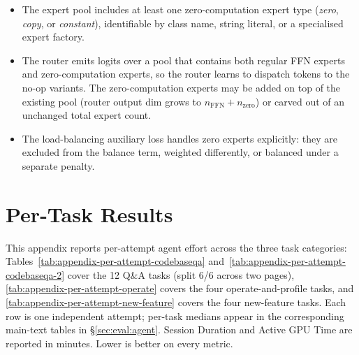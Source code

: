 \begin{itemize}
  \setlength\itemsep{1pt}
  \item[R1.] The expert pool includes at least one zero-computation expert type (\emph{zero}, \emph{copy}, or \emph{constant}), identifiable by class name, string literal, or a specialised expert factory.
  \item[R2.] The router emits logits over a pool that contains both regular FFN experts and zero-computation experts, so the router learns to dispatch tokens to the no-op variants. The zero-computation experts may be added on top of the existing pool (router output dim grows to $n_{\mathrm{FFN}} + n_{\mathrm{zero}}$) or carved out of an unchanged total expert count.
  \item[R3.] The load-balancing auxiliary loss handles zero experts explicitly: they are excluded from the balance term, weighted differently, or balanced under a separate penalty.
\end{itemize}

\section{Per-Task Results}
\label{sec:appendix:per-task-results}

This appendix reports per-attempt agent effort across the three
task categories: Tables~\ref{tab:appendix-per-attempt-codebaseqa}
and~\ref{tab:appendix-per-attempt-codebaseqa-2} cover the 12 Q\&A
tasks (split 6/6 across two pages),
\autoref{tab:appendix-per-attempt-operate} covers the four
operate-and-profile tasks, and
\autoref{tab:appendix-per-attempt-new-feature} covers the four
new-feature tasks. Each row is one independent attempt;
per-task medians appear in the corresponding main-text tables in
\S\ref{sec:eval:agent}. Session Duration and Active GPU Time are
reported in minutes. Lower is better on every metric.

